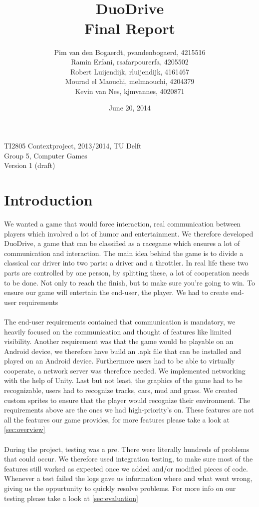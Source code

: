 \documentclass[11pt,twoside,a4paper]{article}
\title{\HRule \\[0.0cm] \huge{DuoDrive}\\
 \large{Final Report} \HRule \\[0.0cm]}
\author{
    Pim van den Bogaerdt, pvandenbogaerd, 4215516\\
    Ramin Erfani, rsafarpourerfa, 4205502\\
    Robert Luijendijk, rluijendijk, 4161467\\
    Mourad el Maouchi, melmaouchi, 4204379\\
    Kevin van Nes, kjmvannes, 4020871
}
\date{June 20, 2014}
\begin{document}
\maketitle

\begin{center}
TI2805 Contextproject, 2013/2014, TU Delft\\
Group 5, Computer Games\\
Version 1 (draft)
\end{center}
\clearpage

\section{Introduction}
We wanted a game that would force interaction, real communication between players which involved a lot of humor and entertainment. We therefore developed DuoDrive, a game that can be classified as a racegame which ensures a lot of communication and interaction. The main idea behind the game is to divide a classical car driver into two parts: a driver and a throttler. In real life these two parts are controlled by one person, by splitting these, a lot of cooperation needs to be done. Not only to reach the finish, but to make sure you're going to win. To ensure our game will entertain the end-user, the player. We had to create end-user requirements\\\\
The end-user requirements contained that communication is mandatory, we heavily focused on the communication and thought of features like limited visibility. Another requirement was that the game would be playable on an Android device, we therefore have build an .apk file that can be installed and played on an Android device. Furthermore users had to be able to virtually cooperate, a network server was therefore needed. We implemented networking with the help of Unity. Last but not least, the graphics of the game had to be recognizable, users had to recognize tracks, cars, mud and grass. We created custom sprites to ensure that the player would recognize their environment. The requirements above are the ones we had high-priority's on. These features are not all the features our game provides, for more features please take a look at \ref{sec:overview}\\\\
During the project, testing was a pre. There were literally hundreds of problems that could occur. We therefore used integration testing, to make sure most of the features still worked as expected once we added and/or modified pieces of code. Whenever a test failed the logs gave us information where and what went wrong, giving us the oppurtunity to quickly resolve problems. For more info on our testing please take a look at \ref{sec:evaluation}
\end{document}
